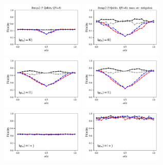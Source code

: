\documentclass[a4paper]{article}
\begin{document}
\begin{figure}[H]
	\centering
	\includegraphics[width=0.35\textwidth]{fidelity_qc6_mit1_state0}
	\includegraphics[width=0.35\textwidth]{fidelity_qc6_mit0_state0}
	\\
	\includegraphics[width=0.35\textwidth]{fidelity_qc6_mit1_state1}
	\includegraphics[width=0.35\textwidth]{fidelity_qc6_mit0_state1}
	\\
	\includegraphics[width=0.35\textwidth]{fidelity_qc6_mit1_state2}
	\includegraphics[width=0.35\textwidth]{fidelity_qc6_mit0_state2}

\end{figure}
\end{document}
